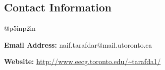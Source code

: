 \documentclass[margin,line]{res}
\newcommand{\onecol}[1]{
  \begin{minipage}{\linewidth}
    {#1}
  \end{minipage}
}
\begin{document}


\begin{resume}

\section{\sc Contact Information}
\vspace{.05in}
\begin{tabular}{@{}p{5in}p{2in}}

\onecol{\textbf{Email Address:} naif.tarafdar@mail.utoronto.ca} {} 
\onecol{\textbf{Website:} \url{http://www.eecg.toronto.edu/~tarafda1/} } {}
\end{tabular}







%


%
%

\end{resume}
\end{document}
